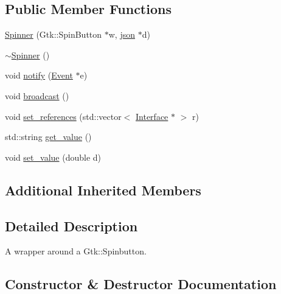 \subsection*{Public Member Functions}
\begin{DoxyCompactItemize}
\item 
\hyperlink{classmc_1_1Spinner_a96d963ce40e54531912178afc95ba9a5}{Spinner} (Gtk\+::\+Spin\+Button $\ast$w, \hyperlink{application_8hpp_ab701e3ac61a85b337ec5c1abaad6742d}{json} $\ast$d)
\item 
\hyperlink{classmc_1_1Spinner_a6e9f8cdd594f84e5a58d96c40de9c3aa}{$\sim$\+Spinner} ()
\item 
void \hyperlink{classmc_1_1Spinner_af3efb6a9cec2d6e3bfdb85f2cc88b0be}{notify} (\hyperlink{classmc_1_1Event}{Event} $\ast$e)
\item 
void \hyperlink{classmc_1_1Spinner_a6709da2aec22fdd2d8d19679c0f60762}{broadcast} ()
\item 
void \hyperlink{classmc_1_1Spinner_aec39936ffbdebb33a016d5ec5b681ddb}{set\+\_\+references} (std\+::vector$<$ \hyperlink{classmc_1_1Interface}{Interface} $\ast$ $>$ r)
\item 
std\+::string \hyperlink{classmc_1_1Spinner_a4675ce29a95e79138dd209ef6af5607d}{get\+\_\+value} ()
\item 
void \hyperlink{classmc_1_1Spinner_a07b81c140918785ac424222634ef4b03}{set\+\_\+value} (double d)
\end{DoxyCompactItemize}
\subsection*{Additional Inherited Members}


\subsection{Detailed Description}
A wrapper around a Gtk\+::\+Spinbutton. 

\subsection{Constructor \& Destructor Documentation}
